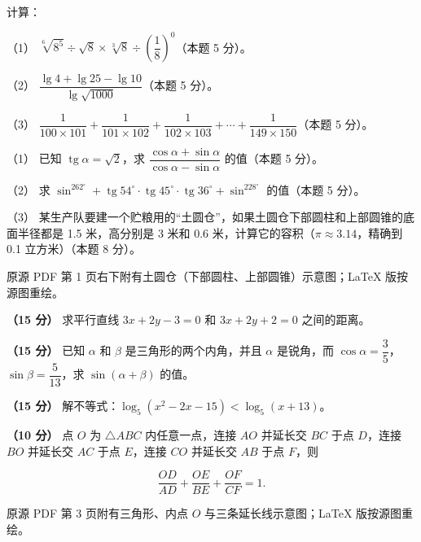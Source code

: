 \begin{question}
计算：

（1） $\sqrt[6]{8^5}\div\sqrt{8}\times\sqrt[3]{8}\div\left(\dfrac18\right)^0$（本题 5 分）。

（2） $\dfrac{\lg 4+\lg 25-\lg 10}{\lg\sqrt{1000}}$（本题 5 分）。

（3） $\dfrac{1}{100\times101}+\dfrac{1}{101\times102}+\dfrac{1}{102\times103}+\cdots+\dfrac{1}{149\times150}$（本题 5 分）。

\Needspace{0.4\textheight}
\end{question}
\begin{question}

（1） 已知 $\operatorname{tg}\alpha=\sqrt2$，求 $\dfrac{\cos\alpha+\sin\alpha}{\cos\alpha-\sin\alpha}$ 的值（本题 5 分）。

（2） 求 $\sin^262^\circ+\operatorname{tg}54^\circ\cdot\operatorname{tg}45^\circ\cdot\operatorname{tg}36^\circ+\sin^228^\circ$ 的值（本题 5 分）。

（3） 某生产队要建一个贮粮用的“土圆仓”，如果土圆仓下部圆柱和上部圆锥的底面半径都是 1.5 米，高分别是 3 米和 0.6 米，计算它的容积（$\pi\approx3.14$，精确到 0.1 立方米）（本题 8 分）。

\begin{gktip}
原源 PDF 第 1 页右下附有土圆仓（下部圆柱、上部圆锥）示意图；LaTeX 版按源图重绘。
\end{gktip}
\nopagebreak[4]
\begin{center}\end{center}
\nopagebreak[4]
\end{question}
\begin{question}
\textbf{（15 分）} 求平行直线 $3x+2y-3=0$ 和 $3x+2y+2=0$ 之间的距离。

\end{question}
\begin{question}
\textbf{（15 分）} 已知 $\alpha$ 和 $\beta$ 是三角形的两个内角，并且 $\alpha$ 是锐角，而 $\cos\alpha=\dfrac35$，$\sin\beta=\dfrac5{13}$，求 $\sin(\alpha+\beta)$ 的值。

\end{question}
\begin{question}
\textbf{（15 分）} 解不等式：$\log_5(x^2-2x-15)<\log_5(x+13)$。

\Needspace{0.4\textheight}
\end{question}
\begin{question}
\textbf{（10 分）} 点 $O$ 为 $\triangle ABC$ 内任意一点，连接 $AO$ 并延长交 $BC$ 于点 $D$，连接 $BO$ 并延长交 $AC$ 于点 $E$，连接 $CO$ 并延长交 $AB$ 于点 $F$，则

\nopagebreak[4]
\[
\frac{OD}{AD}+\frac{OE}{BE}+\frac{OF}{CF}=1.
\]

\begin{gktip}
原源 PDF 第 3 页附有三角形、内点 $O$ 与三条延长线示意图；LaTeX 版按源图重绘。
\end{gktip}
\nopagebreak[4]
\begin{center}\end{center}
\nopagebreak[4]
\end{question}

